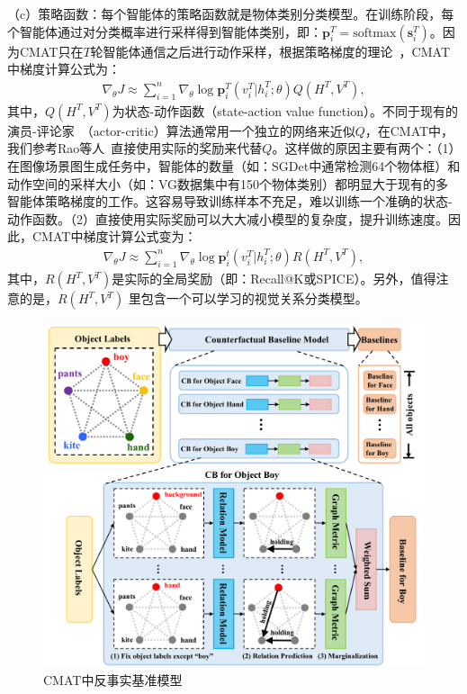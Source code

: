 （c）策略函数：每个智能体的策略函数就是物体类别分类模型。在训练阶段，每个智能体通过对分类概率进行采样得到智能体类别，即：$\bm{p}^T_i = \text{softmax}(\bm{s}^T_i)$。因为CMAT只在$T$轮智能体通信之后进行动作采样，根据策略梯度的理论~\cite{sutton2000policy}，CMAT中梯度计算公式为：
\begin{align}
\nabla_{\theta} J \approx \sum^n_{i=1} \nabla_{\theta} \log \bm{p}^T_i (v^T_i|h^T_i; \theta)Q(H^T, V^T),
\end{align}
其中，$Q(H^T, V^T)$为状态-动作函数（state-action value function）。不同于现有的演员-评论家~\cite{bahdanau2017actor,lowe2017multi,konda2000actor}（actor-critic）算法通常用一个独立的网络来近似$Q$，在CMAT中，我们参考Rao等人~\cite{rao2018learning}直接使用实际的奖励来代替$Q$。这样做的原因主要有两个：（1）在图像场景图生成任务中，智能体的数量（如：SGDet中通常检测64个物体框）和动作空间的采样大小（如：VG数据集中有150个物体类别）都明显大于现有的多智能体策略梯度的工作。这容易导致训练样本不充足，难以训练一个准确的状态-动作函数。（2）直接使用实际奖励可以大大减小模型的复杂度，提升训练速度。因此，CMAT中梯度计算公式变为：
\begin{align} \label{ch4:eq:eq_7}
\nabla_{\theta} J \approx \sum^n_{i=1} \nabla_{\theta} \log \bm{p}^t_i (v^T_i|h^T_i; \theta) R(H^T, V^T),
\end{align}
其中，$R(H^T, V^T)$是实际的全局奖励（即：Recall@K或SPICE）。另外，值得注意的是，$R(H^T, V^T)$ 里包含一个可以学习的视觉关系分类模型。

\begin{figure}[t]
    \centering
        \includegraphics[width=0.9\linewidth]{chapter4/res/baseline.pdf}
    \caption{CMAT中反事实基准模型}
    \label{ch4:fig:baseline}
\end{figure}

